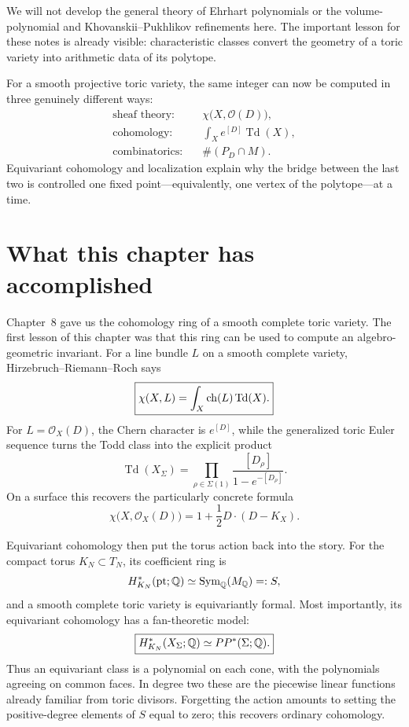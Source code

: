 We will not develop the general theory of Ehrhart polynomials or the
volume-polynomial and Khovanskii--Pukhlikov refinements here.  The
important lesson for these notes is already visible: characteristic
classes convert the geometry of a toric variety into arithmetic data
of its polytope.

\begin{tcolorbox}[
  colback=PredictionTeal!5,
  colframe=PredictionTeal,
  title={The punchline},
  fonttitle=\bfseries
]
For a smooth projective toric variety, the same integer can now be
computed in three genuinely different ways:
\[
\boxed{
\begin{aligned}
\text{sheaf theory:}\quad
&\chi\bigl(X,\mathcal O(D)\bigr),
\\[1mm]
\text{cohomology:}\quad
&\int_X e^{[D]}\operatorname{Td}(X),
\\[1mm]
\text{combinatorics:}\quad
&\#(P_D\cap M).
\end{aligned}}
\]
Equivariant cohomology and localization explain why the bridge between
the last two is controlled one fixed point---equivalently, one vertex
of the polytope---at a time.
\end{tcolorbox}

\clearpage
\section*{What this chapter has accomplished}

Chapter~8 gave us the cohomology ring of a smooth complete toric
variety.  The first lesson of this chapter was that this ring can be
used to compute an algebro-geometric invariant.  For a line bundle
\(L\) on a smooth complete variety, Hirzebruch--Riemann--Roch says
\[
\boxed{
\chi(X,L)
=
\int_X\operatorname{ch}(L)\operatorname{Td}(X).
}
\]
For \(L=\mathcal O_X(D)\), the Chern character is \(e^{[D]}\), while
the generalized toric Euler sequence turns the Todd class into the
explicit product
\[
\boxed{
\operatorname{Td}(X_\Sigma)
=
\prod_{\rho\in\Sigma(1)}
\frac{[D_\rho]}{1-e^{-[D_\rho]}}.
}
\]
On a surface this recovers the particularly concrete formula
\[
\chi\bigl(X,\mathcal O_X(D)\bigr)
=
1+\frac12D\cdot(D-K_X).
\]

Equivariant cohomology then put the torus action back into the story.
For the compact torus \(K_N\subset T_N\), its coefficient ring is
\[
H_{K_N}^*(\mathrm{pt};\mathbb{Q})
\simeq
\operatorname{Sym}_{\mathbb{Q}}(M_{\mathbb{Q}})=:S,
\]
and a smooth complete toric variety is equivariantly formal.  Most
importantly, its equivariant cohomology has a fan-theoretic model:
\[
\boxed{
H_{K_N}^*(X_\Sigma;\mathbb{Q})
\simeq
PP^*(\Sigma;\mathbb{Q}).
}
\]
Thus an equivariant class is a polynomial on each cone, with the
polynomials agreeing on common faces.  In degree two these are the
piecewise linear functions already familiar from toric divisors.
Forgetting the action amounts to setting the positive-degree elements
of \(S\) equal to zero; this recovers ordinary cohomology.

